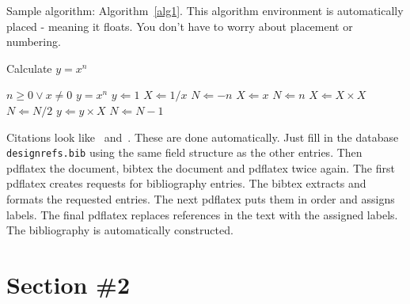 Sample algorithm:  Algorithm~\ref{alg1}.  This algorithm environment is automatically placed - meaning it floats.   You don't have to worry about placement or numbering.  

\begin{algorithm} [tbh]                     %
\caption{Calculate $y = x^n$}          %
\label{alg1}                           %
\begin{algorithmic}                    %
    \REQUIRE $n \geq 0 \vee x \neq 0$
    \ENSURE $y = x^n$
    \STATE $y \Leftarrow 1$
        \STATE $X \Leftarrow 1 / x$
        \STATE $N \Leftarrow -n$
    \ELSE
        \STATE $X \Leftarrow x$
        \STATE $N \Leftarrow n$
    \ENDIF
            \STATE $X \Leftarrow X \times X$
            \STATE $N \Leftarrow N / 2$
        \ELSE[$N$ is odd]
            \STATE $y \Leftarrow y \times X$
            \STATE $N \Leftarrow N - 1$
        \ENDIF
    \ENDWHILE
\end{algorithmic}
\end{algorithm}
Citations look like~\cite{Choset:2005:PRM, arkin2009governing, lavalle2006}  and~\cite{wiki:asimo,lumelsky:1987, nolfi2000evolutionary}.  These are done automatically.  Just fill in the database {\tt designrefs.bib} using the same field structure as the other entries.  Then pdflatex the document, bibtex the document and pdflatex twice again.  The first pdflatex creates requests for bibliography entries.
The bibtex extracts and formats the requested entries.  The next pdflatex puts them in order and assigns labels.  The final pdflatex replaces references in the text with the assigned labels.
The bibliography is automatically constructed.  

\section{Section \#2}

